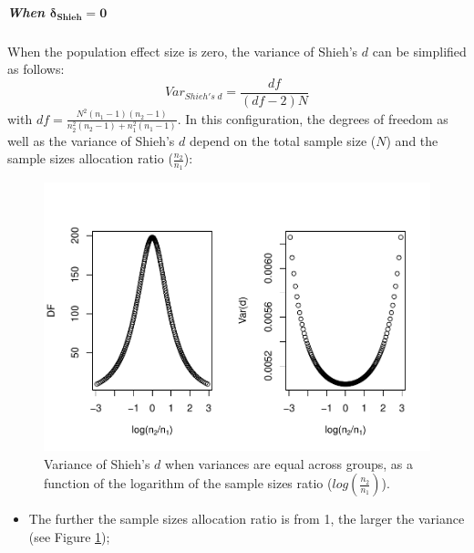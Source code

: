 \documentclass[
  english,
  man,mask]{apa6}
\providecommand{\tightlist}{%
  \setlength{\itemsep}{0pt}\setlength{\parskip}{0pt}}
\let\oldsubparagraph\subparagraph
\renewcommand{\subparagraph}[1]{\oldsubparagraph{#1}\mbox{}}
\begin{document}
\hypertarget{when-bmdelta_shieh-0}{%
\subparagraph{\texorpdfstring{When \(\bm{\delta_{Shieh} = 0}\)}{When \textbackslash bm\{\textbackslash delta\_\{Shieh\} = 0\}}}\label{when-bmdelta_shieh-0}}

When the population effect size is zero, the variance of Shieh's \(d\) can be simplified as follows:
\[Var_{Shieh's \; d} = \frac{df}{(df-2)N}\]
with \(df = \frac{N^2(n_1-1)(n_2-1)}{n_2^2(n_2-1)+n_1^2(n_1-1)}\). In this configuration, the degrees of freedom as well as the variance of Shieh's \(d\) depend on the total sample size (\(N\)) and the sample sizes allocation ratio (\(\frac{n_2}{n_1}\)):

\begin{figure}
\centering
\includegraphics{SupMat1_files/figure-latex/varshiehHomNratio2-1.pdf}
\caption{\label{fig:varshiehHomNratio2}Variance of Shieh's \(d\) when variances are equal across groups, as a function of the logarithm of the sample sizes ratio (\(log\left(\frac{n_2}{n_1} \right)\)).}
\end{figure}

\begin{itemize}
\tightlist
\item
  The further the sample sizes allocation ratio is from 1, the larger the variance (see Figure \ref{fig:varshiehHomNratio2});
\end{itemize}
\end{document}
